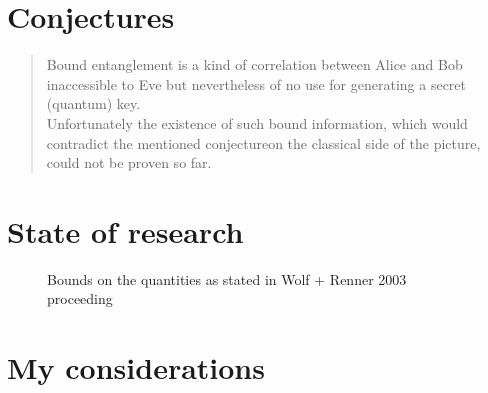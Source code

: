 \section{Conjectures}
			\begin{quotation}
			Bound entanglement is a kind of correlation between Alice and Bob inaccessible to Eve but nevertheless of no use for generating a secret (quantum) key.\\
			Unfortunately the existence of such bound information, which would contradict the mentioned conjecture\footnotemark on the classical side of the picture, could not be proven so far.
		\end{quotation}
		
		
	\section{State of research}
		\begin{figure}[h]
			\centering
			
			\caption{Bounds on the quantities as stated in Wolf + Renner 2003 proceeding}
		\end{figure}
	\section{My considerations}
